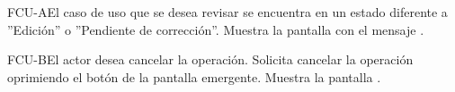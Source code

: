 	\begin{UCtrayectoriaA}{FCU-A}{El caso de uso que se desea revisar se encuentra en un estado diferente a ''Edición'' o ''Pendiente de corrección''.}
		\UCpaso[\UCsist] Muestra la pantalla  con el mensaje .
	\end{UCtrayectoriaA}

	\begin{UCtrayectoriaA}{FCU-B}{El actor desea cancelar la operación.}
		\UCpaso[\UCactor] Solicita cancelar la operación oprimiendo el botón  de la pantalla emergente.
		\UCpaso[\UCsist] Muestra la pantalla .
	\end{UCtrayectoriaA}